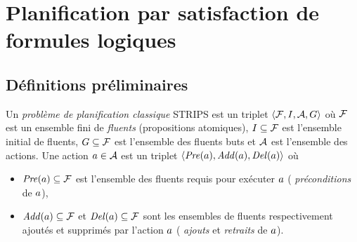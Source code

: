 \section{Planification par satisfaction de formules logiques}
%



\subsection{Définitions préliminaires}


\begin{definition}
Un \emph{problème de planification classique} STRIPS est un triplet $\langle \mathcal{F}, I, \mathcal{A} , G \rangle$ où $\mathcal{F}$ est un ensemble fini de \emph{fluents} (propositions atomiques), $I \subseteq \mathcal{F}$ est l'ensemble initial de fluents, $G \subseteq \mathcal{F}$ est l'ensemble des fluents buts et $\mathcal{A}$ est l'ensemble des actions.
Une action $a \in \mathcal{A}$ est un triplet $\langle \mathit{Pre}(a), \mathit{Add}(a), \mathit{Del}(a) \rangle$ où

\begin{itemize}
\item $\mathit{Pre}(a) \subseteq \mathcal{F}$ est l'ensemble des fluents requis pour exécuter $a$ (%
\emph{préconditions} de $a$),
\item $\mathit{Add}(a) \subseteq \mathcal{F}$ et $\mathit{Del}(a) \subseteq \mathcal{F}$ sont les ensembles de fluents respectivement ajoutés et supprimés par l'action $a$ (%
\emph{ajouts} et %
\emph{retraits} de $a$).
\end{itemize}
\end{definition}





